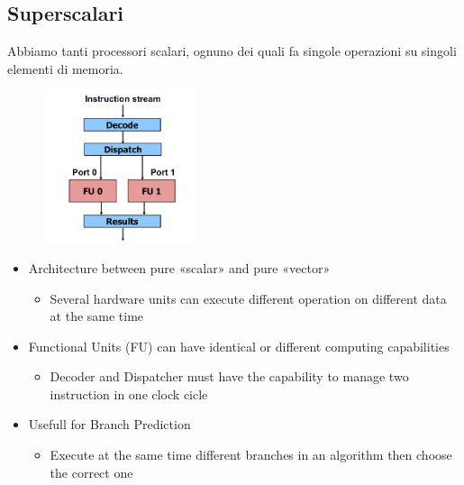 \subsection{Superscalari}
Abbiamo tanti processori scalari, ognuno dei quali fa singole operazioni su singoli elementi di memoria. \\

\begin{figure}[ht]
    \centering
    \includegraphics[width=0.4\textwidth]{figure_parallel/superscalar.png}
\end{figure}
\FloatBarrier

\begin{itemize}
    \item Architecture between pure «scalar» and pure «vector»
    \begin{itemize}
        \item Several hardware units can execute different operation on different data at the same time
    \end{itemize}
\end{itemize}




\begin{itemize}
    \item Functional Units (FU) can have identical or different computing capabilities
    \begin{itemize}
        \item Decoder and Dispatcher must have the capability to manage two instruction in one clock cicle
    \end{itemize}
\end{itemize}

\begin{itemize}
    \item Usefull for Branch Prediction
    \begin{itemize}
        \item Execute at the same time different branches in an algorithm then choose the correct one
    \end{itemize}
\end{itemize}



